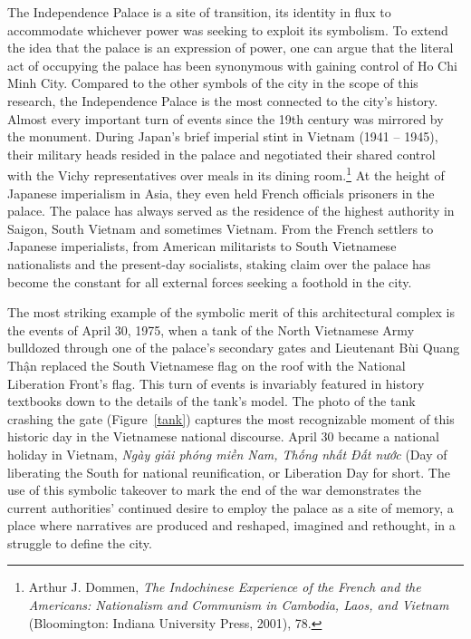 \vi The Independence Palace is a site of transition, its identity in flux to accommodate whichever power was seeking to exploit its symbolism. To extend the idea that the palace is an expression of power, one can argue that the literal act of occupying the palace has been synonymous with gaining control of Ho Chi Minh City. Compared to the other symbols of the city in the scope of this research, the Independence Palace is the most connected to the city’s history. Almost every important turn of events since the 19th century was mirrored by the monument. During Japan’s brief imperial stint in Vietnam (1941 – 1945), their military heads resided in the palace and negotiated their shared control with the Vichy representatives over meals in its dining room.\footnote{Arthur J. Dommen, \textit{The Indochinese Experience of the French and the Americans: Nationalism and Communism in Cambodia, Laos, and Vietnam} (Bloomington: Indiana University Press, 2001), 78.} At the height of Japanese imperialism in Asia, they even held French officials prisoners in the palace. The palace has always served as the residence of the highest authority in Saigon, South Vietnam and sometimes Vietnam. From the French settlers to Japanese imperialists, from American militarists to South Vietnamese nationalists and the present-day socialists, staking claim over the palace has become the constant for all external forces seeking a foothold in the city.

The most striking example of the symbolic merit of this architectural complex is the events of April 30, 1975, when a tank of the North Vietnamese Army bulldozed through one of the palace’s secondary gates and Lieutenant Bùi Quang Thận replaced the South Vietnamese flag on the roof with the National Liberation Front’s flag. This turn of events is invariably featured in history textbooks down to the details of the tank’s model. The photo of the tank crashing the gate (Figure~\ref{tank}) captures the most recognizable moment of this historic day in the Vietnamese national discourse. April 30  became a national holiday in Vietnam, \textit{Ngày giải phóng miền Nam, Thống nhất Đất nước} (Day of liberating the South for national reunification, or Liberation Day for short. The use of this symbolic takeover to mark the end of the war demonstrates the current authorities’ continued desire to employ the palace as a site of memory, a place where narratives are produced and reshaped, imagined and rethought, in a struggle to define the city. \en

